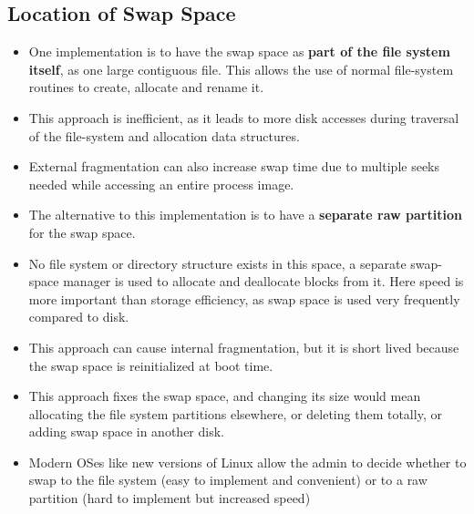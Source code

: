 \documentclass{article}
\theoremstyle{plain}
\theoremstyle{definition}
\begin{document}
\subsection{Location of Swap Space}
\begin{itemize}
    \item One implementation is to have the swap space as \textbf{part of the file system itself}, as one large contiguous file. This allows the use of normal file-system routines to create, allocate and rename it.
    
    \item This approach is inefficient, as it leads to more disk accesses during traversal of the file-system and allocation data structures. 
    
    \item External fragmentation can also increase swap time due to multiple seeks needed while accessing an entire process image. 
    
    \item The alternative to this implementation is to have a \textbf{separate raw partition} for the swap space. 
    
    \item No file system or directory structure exists in this space, a separate swap-space manager is used to allocate and deallocate blocks from it. Here speed is more important than storage efficiency, as swap space is used very frequently compared to disk. 
    
    \item This approach can cause internal fragmentation, but it is short lived because the swap space is reinitialized at boot time. 
    
    \item This approach fixes the swap space, and changing its size would mean allocating the file system partitions elsewhere, or deleting them totally, or adding swap space in another disk. 
    
    \item Modern OSes like new versions of Linux allow the admin to decide whether to swap to the file system (easy to implement and convenient) or to a raw partition (hard to implement but increased speed)
\end{itemize}
\end{document}
